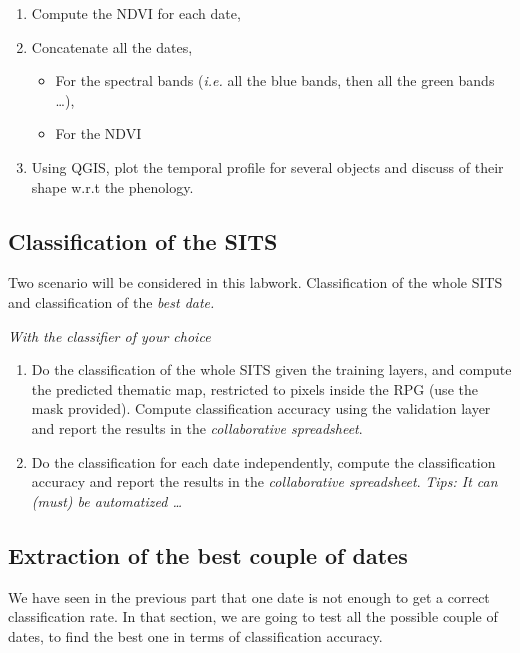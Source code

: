 \documentclass[a4paper,11pt,DIV=18]{scrartcl}
\begin{document}
\begin{work}
\begin{enumerate}
\item Compute the NDVI for each date,
\item Concatenate all the dates,
\begin{itemize}
\item For  the spectral bands  (\emph{i.e.} all the  blue bands, then  all the
green bands \ldots{}),
\item For the NDVI
\end{itemize}
\item Using QGIS,  plot the  temporal  profile for  several objects  and
discuss of their shape w.r.t the phenology.
\end{enumerate}
\end{work}
\subsection{Classification of the SITS}
\label{sec:org816e422}
Two scenario will be considered in this labwork. Classification of the
whole SITS and classification of the \emph{best date.}

\begin{work}
\emph{With the classifier of your choice}
\begin{enumerate}
\item Do the classification of the  whole SITS given the training layers,
and compute the predicted thematic map, restricted to pixels inside
the RPG  (use the  mask provided). Compute  classification accuracy
using  the  validation   layer  and  report  the   results  in  the
\emph{collaborative spreadsheet}.
\item Do the  classification for  each date  independently, compute  the
classification accuracy and report the results in the \emph{collaborative
spreadsheet}. \emph{Tips: It can (must) be automatized \ldots{}}
\end{enumerate}
\end{work}
\subsection{Extraction of the best couple of dates}
\label{sec:org21a9f0a}
We have seen in the previous part that one date is not enough to get a
correct classification rate. In that section, we are going to test all
the  possible couple  of  dates, to  find  the best  one  in terms  of
classification accuracy. 
\end{document}
